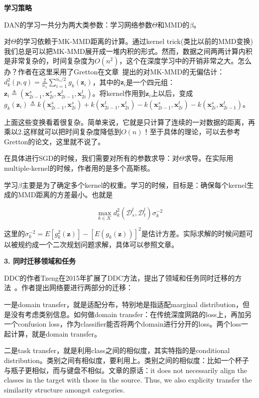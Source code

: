 \textbf{学习策略}

DAN的学习一共分为两大类参数：学习网络参数$\Theta$和MMD的$\beta$。

对$\Theta$的学习依赖于MK-MMD距离的计算。通过kernel trick(类比以前的MMD变换)我们总是可以把MK-MMD展开成一堆内积的形式。然而，数据之间两两计算内积是非常复杂的，时间复杂度为$O(n^2)$，这个在深度学习中的开销非常之大。怎么办？作者在这里采用了Gretton在文章~\cite{gretton2012optimal}提出的对MK-MMD的无偏估计：$d^2_k(p,q)=\frac{2}{n_s}\sum_{i=1}^{n_s/2}g_k(\mathbf{z}_i)$，其中的$\mathbf{z}_i$是一个四元组：$\mathbf{z}_i \triangleq (\mathbf{x}^s_{2i-1},\mathbf{x}^s_{2i},\mathbf{x}^t_{2i-1},\mathbf{x}^t_{2i})$。将kernel作用到$\mathbf{z}_i$上以后，变成$g_k(\mathbf{z}_i) \triangleq k(\mathbf{x}^s_{2i-1},\mathbf{x}^s_{2i})+k(\mathbf{x}^t_{2i-1},\mathbf{x}^t_{2i})-k(\mathbf{x}^s_{2i-1},\mathbf{x}^t_{2i})-k(\mathbf{x}^s_{2i},\mathbf{x}^t_{2i-1})$。

上面这些变换看着很复杂。简单来说，它就是只计算了连续的一对数据的距离，再乘以2.这样就可以把时间复杂度降低到$O(n)$！至于具体的理论，可以去参考Gretton的论文，这里就不说了。

在具体进行SGD的时候，我们需要对所有的参数求导：对$\Theta$求导。在实际用multiple-kernel的时候，作者用的是多个高斯核。

学习$\beta$主要是为了确定多个kernel的权重。学习的时候，目标是：确保每个kernel生成的MMD距离的方差最小。也就是

\begin{equation}
	\max_{k \in \mathcal{K}} d^2_k(\mathcal{D}^l_s,\mathcal{D}^l_t) \sigma^{-2}_k
\end{equation}

这里的$\sigma^{-2}_k=E[g^2_k(\mathbf{z})]-[E(g_k(\mathbf{z}))]^2$是估计方差。实际求解的时候问题可以被规约成一个二次规划问题求解，具体可以参照文章。

\textbf{3. 同时迁移领域和任务}

DDC的作者Tzeng在2015年扩展了DDC方法，提出了领域和任务同时迁移的方法~\cite{tzeng2015simultaneous}。作者提出网络要进行两部分的迁移：

一是domain transfer，就是适配分布，特别地是指适配marginal distribution，但是没有考虑类别信息。如何做domain transfer：在传统深度网路的loss上，再加另一个confusion loss，作为classifier能否将两个domain进行分开的loss。两个loss一起计算，就是domain transfer。

二是task transfer，就是利用class之间的相似度，其实特指的是conditional distribution。类别之间有相似度，要利用上。类别之间的相似度：比如一个杯子与瓶子更相似，而与键盘不相似。文章的原话：it does not necessarily align the classes in the target with those in the source. Thus, we also explicity transfer the similarity structure amongst categories.

